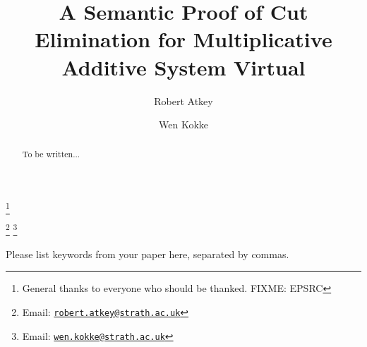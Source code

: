 \documentclass[twoside,11pt]{entics}
\begin{document}
\begin{frontmatter}
  \title{A Semantic Proof of Cut Elimination for Multiplicative Additive System Virtual}
  \thanks[ALL]{General thanks to everyone who should be thanked. FIXME: EPSRC}
  \author{Robert Atkey}
  \author{Wen Kokke}
  \address[msp]{%
    Mathematically Structured Programming\\
    Computer and Information Sciences\\
    University of Strathclyde\\
    Glasgow, Scotland, UK}
  \thanks[bobemail]%
  {Email: \href{robert.atkey@strath.ac.uk}%
    {\texttt{\normalshape robert.atkey@strath.ac.uk}}}
  \thanks[wenemail]%
  {Email: \href{wen.kokke@strath.ac.uk}%
    {\texttt{\normalshape wen.kokke@strath.ac.uk}}}
  \begin{abstract}
    To be written...
  \end{abstract}
  \begin{keyword}
    Please list keywords from your paper here, separated by commas.
  \end{keyword}
\end{frontmatter}










\end{document}
